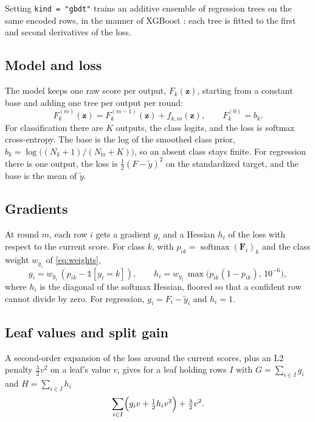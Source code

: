\documentclass[11pt]{article}
\theoremstyle{plain}
\theoremstyle{definition}
\newcommand{\code}[1]{\texttt{#1}}
\newcommand{\softmax}{\operatorname{softmax}}
\begin{document}
Setting \code{kind = "gbdt"} trains an additive ensemble of regression trees on
the same encoded rows, in the manner of XGBoost \cite{xgboost}: each tree is
fitted to the first and second derivatives of the loss.

\subsection{Model and loss}

The model keeps one raw score per output, $F_k(\bm{z})$, starting from a
constant base and adding one tree per output per round:
\begin{equation}\label{eq:additive}
  F_k^{(m)}(\bm{z}) = F_k^{(m-1)}(\bm{z}) + f_{k,m}(\bm{z}), \qquad
  F_k^{(0)} = b_k .
\end{equation}
For classification there are $K$ outputs, the class logits, and the loss is
softmax cross-entropy. The base is the log of the smoothed class prior,
$b_k = \log\bigl((N_k + 1)/(N_{\text{tr}} + K)\bigr)$, so an absent class stays
finite. For regression there is one output, the loss is
$\tfrac12(F - \tilde{y})^2$ on the standardized target, and the base is the
mean of $\tilde{y}$.

\subsection{Gradients}

At round $m$, each row $i$ gets a gradient $g_i$ and a Hessian $h_i$ of the
loss with respect to the current score. For class $k$, with
$p_{ik} = \softmax(\bm{F}_i)_k$ and the class weight $w_{y_i}$ of
\cref{eq:weights},
\begin{equation}\label{eq:gradients}
  g_i = w_{y_i}\,(p_{ik} - \mathbb{1}[y_i = k]), \qquad
  h_i = w_{y_i}\,\max\bigl(p_{ik}(1 - p_{ik}),\, 10^{-6}\bigr),
\end{equation}
where $h_i$ is the diagonal of the softmax Hessian, floored so that a confident
row cannot divide by zero. For regression, $g_i = F_i - \tilde{y}_i$ and $h_i = 1$.

\subsection{Leaf values and split gain}

A second-order expansion of the loss around the current scores, plus an L2
penalty $\tfrac{\lambda}{2}v^2$ on a leaf's value $v$, gives for a leaf holding
rows $I$ with $G = \sum_{i\in I} g_i$ and $H = \sum_{i\in I} h_i$
\begin{equation}
  \sum_{i \in I}\Bigl(g_i v + \tfrac12 h_i v^2\Bigr) + \tfrac{\lambda}{2}v^2 .
\end{equation}
\end{document}
